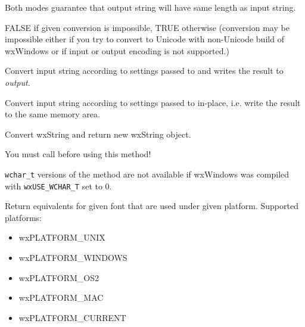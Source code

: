 Both modes guarantee that output string will have same length
as input string.


FALSE if given conversion is impossible, TRUE otherwise
(conversion may be impossible either if you try to convert
to Unicode with non-Unicode build of wxWindows or if input
or output encoding is not supported.)

\label{wxencodingconverterconvert}





Convert input string according to settings passed to
 and writes the result to {\it output}.



Convert input string according to settings passed to
 in-place, i.e. write the result to the
same memory area.


Convert wxString and return new wxString object.


You must call  before using this method!

{\tt wchar\_t} versions of the method are not available if wxWindows was compiled
with {\tt wxUSE\_WCHAR\_T} set to 0.

\label{wxencodingconvertergetplatformequivalents}


Return equivalents for given font that are used
under given platform. Supported platforms:

\begin{itemize}\itemsep=0pt
\item wxPLATFORM\_UNIX
\item wxPLATFORM\_WINDOWS
\item wxPLATFORM\_OS2
\item wxPLATFORM\_MAC
\item wxPLATFORM\_CURRENT
\end{itemize}


